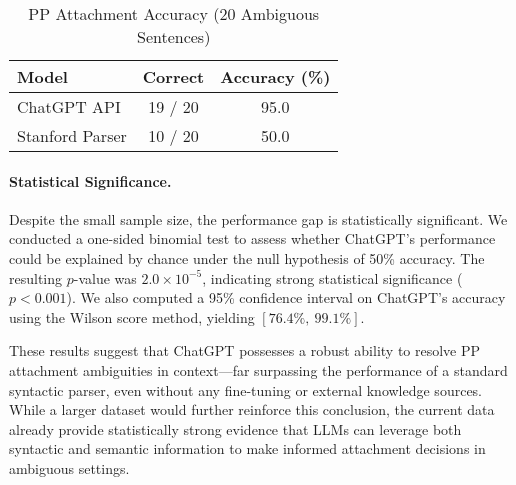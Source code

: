 \begin{table}[h]
\centering
\caption{PP Attachment Accuracy (20 Ambiguous Sentences)}
\label{tab:pp-attachment-results}
\begin{tabular}{lcc}
\toprule
\textbf{Model} & \textbf{Correct} & \textbf{Accuracy (\%)} \\
\midrule
ChatGPT API & 19 / 20 & 95.0 \\
Stanford Parser & 10 / 20 & 50.0 \\
\bottomrule
\end{tabular}
\end{table}

\paragraph{Statistical Significance.}
Despite the small sample size, the performance gap is statistically significant. We conducted a one-sided binomial test to assess whether ChatGPT's performance could be explained by chance under the null hypothesis of 50\% accuracy. The resulting $p$-value was $2.0 \times 10^{-5}$, indicating strong statistical significance ($p < 0.001$). We also computed a 95\% confidence interval on ChatGPT's accuracy using the Wilson score method, yielding $[76.4\%,\ 99.1\%]$.

These results suggest that ChatGPT possesses a robust ability to resolve PP attachment ambiguities in context—far surpassing the performance of a standard syntactic parser, even without any fine-tuning or external knowledge sources. While a larger dataset would further reinforce this conclusion, the current data already provide statistically strong evidence that LLMs can leverage both syntactic and semantic information to make informed attachment decisions in ambiguous settings.

